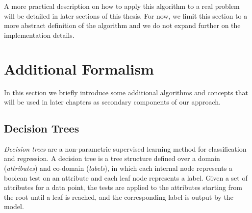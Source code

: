 A more practical description on how to apply this algorithm to a real problem
will be detailed in later sections of this thesis. For now, we limit this 
section to a more abstract definition of the algorithm and we do not expand 
further on the implementation details. 

\section{Additional Formalism} \label{s:addtional}
In this section we briefly introduce some additional algorithms and concepts 
that will be used in later chapters as secondary components of our approach. 

\subsection{Decision Trees}
\textit{Decision trees} are a non-parametric supervised learning method for
classification and regression. A decision tree is a tree structure defined 
over a domain (\textit{attributes}) and co-domain (\textit{labels}), in which
each internal node represents a boolean test on an attribute and each leaf node 
represents a label. Given a set of attributes for a data point, the tests 
are applied to the attributes starting from the root until a leaf is reached, 
and the corresponding label is output by the model. 


